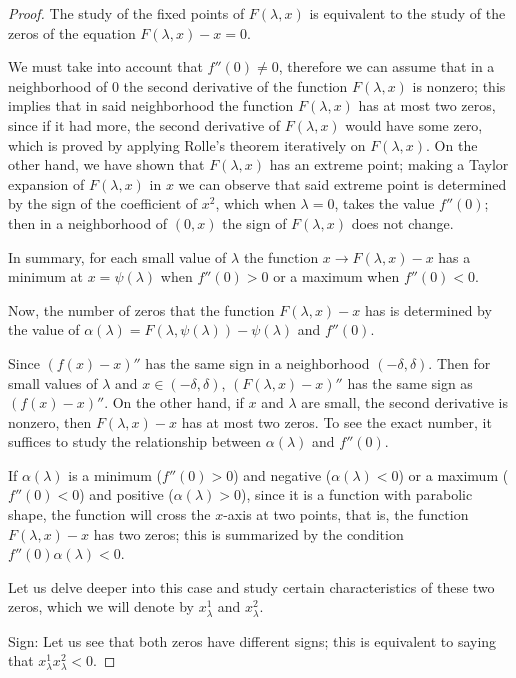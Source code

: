 \documentclass[12pt,a4paper]{report}
\theoremstyle{definition}
\begin{document}
\begin{proof}

The study of the fixed points of $F(\lambda,x)$ is equivalent to the study of the zeros of the equation $F(\lambda,x) - x = 0$.

We must take into account that $f''(0) \neq 0$, therefore we can assume that in a neighborhood of $0$ the second derivative of the function $F(\lambda,x)$ is nonzero; this implies that in said neighborhood the function $F(\lambda,x)$ has at most two zeros, since if it had more, the second derivative of $F(\lambda,x)$ would have some zero, which is proved by applying Rolle's theorem iteratively on $F(\lambda,x)$. On the other hand, we have shown that $F(\lambda,x)$ has an extreme point; making a Taylor expansion of $F(\lambda,x)$ in $x$ we can observe that said extreme point is determined by the sign of the coefficient of $x^2$, which when $\lambda = 0$, takes the value $f''(0)$; then in a neighborhood of $(0,x)$ the sign of $F(\lambda,x)$ does not change.  

In summary, for each small value of $\lambda$ the function $x \to F(\lambda,x) - x$ has a minimum at $x = \psi(\lambda)$ when $f''(0) > 0$ or a maximum when $f''(0) < 0$.

Now, the number of zeros that the function $F(\lambda,x) - x$ has is determined by the value of $\alpha(\lambda) = F(\lambda,\psi(\lambda)) - \psi(\lambda)$ and $f''(0)$.

Since $(f(x)-x)''$ has the same sign in a neighborhood $(-\delta,\delta)$. Then for small values of $\lambda$ and $x \in (-\delta,\delta)$, $(F(\lambda,x) - x)''$ has the same sign as $(f(x)-x)''$. On the other hand, if $x$ and $\lambda$ are small, the second derivative is nonzero, then $F(\lambda,x) - x$ has at most two zeros. To see the exact number, it suffices to study the relationship between $\alpha(\lambda)$ and $f''(0)$.

If $\alpha(\lambda)$ is a minimum ($f''(0) > 0$) and negative ($\alpha(\lambda) < 0$) or a maximum ($f''(0) < 0$) and positive ($\alpha(\lambda) > 0$), since it is a function with parabolic shape, the function will cross the $x$-axis at two points, that is, the function $F(\lambda,x) - x$ has two zeros; this is summarized by the condition $f''(0)\alpha(\lambda) < 0$. 

Let us delve deeper into this case and study certain characteristics of these two zeros, which we will denote by $x^1_\lambda$ and $x^2_\lambda$.

Sign: Let us see that both zeros have different signs; this is equivalent to saying that $x^1_\lambda x^2_\lambda < 0$.


\end{proof}
\end{document}
